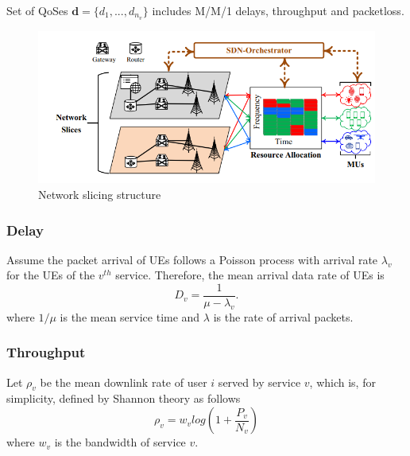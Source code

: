 \documentclass[conference]{IEEEtran}
\begin{document}
Set of QoSes $\mathbf{d} = \{d_1, ..., d_{n_v}\}$ includes M/M/1 delays, throughput and packetloss.
\begin{figure}%
  \centering
    \includegraphics[width=\linewidth]{NS}
  \caption{Network slicing structure \cite{gan}}
  \label{fig:NS}
\end{figure}
\subsubsection{Delay}
Assume the packet arrival of UEs follows a Poisson process with arrival rate $\lambda_v$ for the  UEs of the $v^{th}$ service.
Therefore, the mean arrival data rate of UEs is
\begin{equation}
D_{v} = \frac{1}{\mu - \lambda_v}.
\end{equation}
where $1/\mu$ is the mean service time and $\lambda$ is the rate of arrival packets.
\subsubsection{Throughput}
Let $\rho_v$ be the mean downlink rate of user $i$ served by service $v$, which
is, for simplicity, defined by Shannon theory as follows
\begin{equation}
\rho_v = w_v log(1+\frac{P_v}{N_v}) 
\end{equation}
where $w_v$ is the bandwidth of service $v$.


\end{document}
